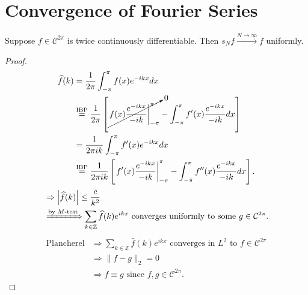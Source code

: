 \documentclass[letterpaper, reqno,11pt]{article}
\newcommand{\ZZ}{\mathbb{Z}}
\begin{document}
\section{Convergence of Fourier Series}

\begin{thm}
  \normalfont Suppose $f \in \mathcal C^{2\pi}$ is twice continuously differentiable. Then $s_N f \xrightarrow{N \to \infty} f$ uniformly.
\end{thm}

\begin{proof}
  \begin{align*}
    \widehat f(k) &= \frac{1}{2\pi} \int_{-\pi}^\pi f(x) e^{-ikx} dx \\
    &\overset{\text{IBP}}{=} \frac{1}{2\pi} \left[\cancelto{0}{\left.f(x) \frac{e^{-ikx}}{-ik}\right|_{-\pi}^\pi} - \int_{-\pi}^\pi f'(x) \frac{e^{-ikx}}{-ik} dx\right] \\
    &= \frac{1}{2\pi ik} \int_{-\pi}^\pi f'(x) e^{-ikx} dx \\
    &\overset{\text{IBP}}{=} \frac{1}{2\pi ik} \left[\left.f'(x) \frac{e^{-ikx}}{-ik}\right|_{-\pi}^\pi - \int_{-\pi}^\pi f''(x) \frac{e^{-ikx}}{-ik} dx\right].
  \end{align*}
  \begin{align*}
    &\Rightarrow \left|\widehat f(k)\right| \leq \frac{c}{k^2} \\
    &\xRightarrow{\text{by $M$-test}} \sum_{k \in \ZZ} \widehat f(k) e^{ikx} \text{ converges uniformly to some $g \in \mathcal C^{2\pi}$}.
  \end{align*}
  \begin{align*}
    \text{Plancherel} &\Rightarrow \sum_{k \in \ZZ} \widehat f(k) e^{ikx} \text{ converges in $L^2$ to $f \in \mathcal C^{2\pi}$} \\
    &\Rightarrow \lVert f - g \rVert_2 = 0 \\
    &\Rightarrow f \equiv g \text{ since $f, g \in \mathcal C^{2\pi}$}.
  \end{align*}
\end{proof}
\end{document}
